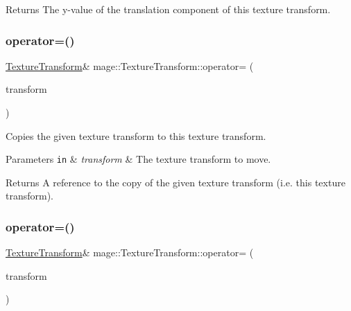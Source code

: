 \begin{DoxyReturn}{Returns}
The y-\/value of the translation component of this texture transform. 
\end{DoxyReturn}
\hypertarget{classmage_1_1_texture_transform_a0166da366dcf3054db133dda5867cf87}{}\label{classmage_1_1_texture_transform_a0166da366dcf3054db133dda5867cf87} 
\subsubsection{\texorpdfstring{operator=()}{operator=()}\hspace{0.1cm}{\footnotesize\ttfamily [1/2]}}
{\footnotesize\ttfamily \hyperlink{classmage_1_1_texture_transform}{Texture\+Transform}\& mage\+::\+Texture\+Transform\+::operator= (\begin{DoxyParamCaption}\item[{const \hyperlink{classmage_1_1_texture_transform}{Texture\+Transform} \&}]{transform }\end{DoxyParamCaption})\hspace{0.3cm}{\ttfamily [default]}}

Copies the given texture transform to this texture transform.


\begin{DoxyParams}[1]{Parameters}
\mbox{\tt in}  & {\em transform} & The texture transform to move. \\
\hline
\end{DoxyParams}
\begin{DoxyReturn}{Returns}
A reference to the copy of the given texture transform (i.\+e. this texture transform). 
\end{DoxyReturn}
\hypertarget{classmage_1_1_texture_transform_a82adfc646b3467f33d92f7f2e24bf28e}{}\label{classmage_1_1_texture_transform_a82adfc646b3467f33d92f7f2e24bf28e} 
\subsubsection{\texorpdfstring{operator=()}{operator=()}\hspace{0.1cm}{\footnotesize\ttfamily [2/2]}}
{\footnotesize\ttfamily \hyperlink{classmage_1_1_texture_transform}{Texture\+Transform}\& mage\+::\+Texture\+Transform\+::operator= (\begin{DoxyParamCaption}\item[{\hyperlink{classmage_1_1_texture_transform}{Texture\+Transform} \&\&}]{transform }\end{DoxyParamCaption})\hspace{0.3cm}{\ttfamily [default]}}

